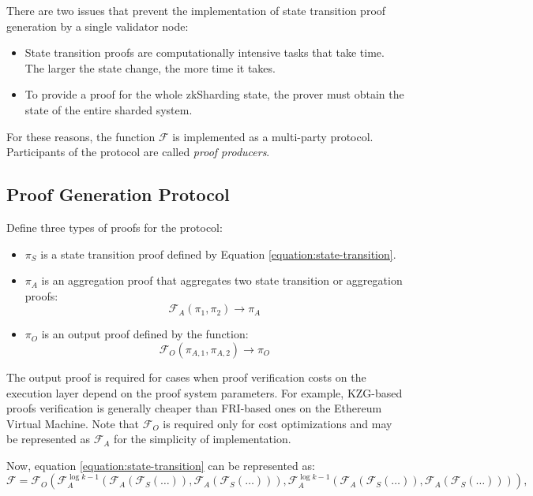 There are two issues that prevent the implementation of state transition proof generation by a single validator node:
\begin{itemize}
    \item State transition proofs are computationally intensive tasks that take time. The larger the state change, the more time it takes.
    \item To provide a proof for the whole zkSharding state, the prover must obtain the state of the entire sharded system.
\end{itemize}

For these reasons, the function \(\mathcal{F}\) is implemented as a multi-party protocol. Participants of the protocol are called \textit{proof producers}.

\subsection{Proof Generation Protocol}

Define three types of proofs for the protocol:
\begin{itemize}
    \item $\pi_S$ is a state transition proof defined by Equation \ref{equation:state-transition}.
    \item $\pi_A$ is an aggregation proof that aggregates two state transition or aggregation proofs:
    \[ \mathcal{F}_A(\pi_{1}, \pi_{2}) \rightarrow \pi_A \]
    \item $\pi_O$ is an output proof defined by the function:
    \[ \mathcal{F}_O(\pi_{A, 1}, \pi_{A, 2}) \rightarrow \pi_O\]
\end{itemize}

The output proof is required for cases 
when proof verification costs on the execution layer 
depend on the proof system parameters. 
For example, KZG-based proofs verification is generally cheaper than FRI-based ones on the Ethereum Virtual Machine.
Note that $\mathcal{F}_O$ is required only for cost optimizations 
 and may be represented as $\mathcal{F}_A$ for the simplicity of implementation.

Now, equation \ref{equation:state-transition} can be represented as:
\[
    \mathcal{F} = \mathcal{F}_O\left(
        \mathcal{F}^{\log{k} - 1}_A\left(
            \mathcal{F}_A(\mathcal{F}_S(\ldots)), \mathcal{F}_A(\mathcal{F}_S(\ldots))\right), 
        \mathcal{F}^{\log{k} - 1}_A\left(
            \mathcal{F}_A(\mathcal{F}_S(\ldots)), \mathcal{F}_A(\mathcal{F}_S(\ldots))\right)
            \right),
\]

